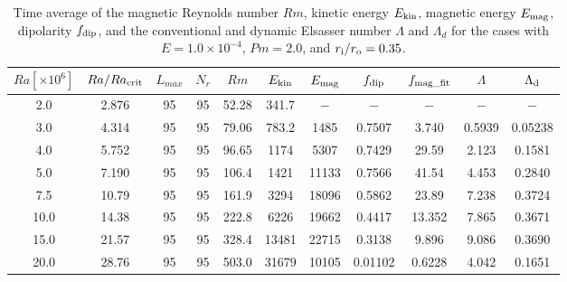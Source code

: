 \begin{table}
{\color{red}
\caption{Time average of the magnetic Reynolds number $Rm$, kinetic energy $E_{\rm kin}$, magnetic energy $E_{\rm mag}$, dipolarity $f_{\rm dip}$, and  the conventional and dynamic Elsasser number $\Lambda$ and $\Lambda_{d}$ for the cases with $E = 1.0 \times 10^{-4}$, $Pm = 2.0$, and $r_{\rm i}/r_{\rm o} = 0.35$.}
}
{\color{red}
  \begin{tabular}{ccccccccccc}
    \hline
     $Ra[\times 10^6]$  &  $Ra/Ra_{\rm crit}$& 
     $L_{max}$ & $N_{r}$ & $Rm$ 
     & $E_{\rm kin}$  &  $E_{\rm mag}$ & $f_{\rm dip}$ & $f_{\rm mag\_fit}$ & $\Lambda$ & $\Lambda_{\rm d}$\\
    \hline
      2.0 & 2.876 & 95 & 95 & 52.28 & 341.7 & $-$ & $-$ & $-$ & $-$ & $-$ \\
      3.0 & 4.314 & 95 & 95 & 79.06 & 783.2 & 1485 & 0.7507 & 3.740 & 0.5939 & 0.05238 \\
      4.0 & 5.752 & 95 & 95 & 96.65 & 1174 & 5307 & 0.7429 & 29.59 & 2.123 & 0.1581 \\
      5.0 & 7.190 & 95 & 95 & 106.4 & 1421 & 11133 & 0.7566 & 41.54 & 4.453 & 0.2840 \\
      7.5 & 10.79 & 95 & 95 & 161.9 & 3294 & 18096 & 0.5862 & 23.89 & 7.238 & 0.3724 \\
      10.0 & 14.38 & 95 & 95 & 222.8 & 6226 & 19662 & 0.4417 & 13.352 & 7.865 & 0.3671 \\
      15.0 & 21.57 & 95 & 95 & 328.4 & 13481 & 22715 & 0.3138 & 9.896 & 9.086 & 0.3690  \\
      20.0 & 28.76 & 95 & 95 & 503.0 & 31679 & 10105 & 0.01102 & 0.6228 & 4.042 & 0.1651 \\
    \hline
  \end{tabular}
 }
\label{table:SummaryEk4_35}
\end{table}
%
%
%
%

